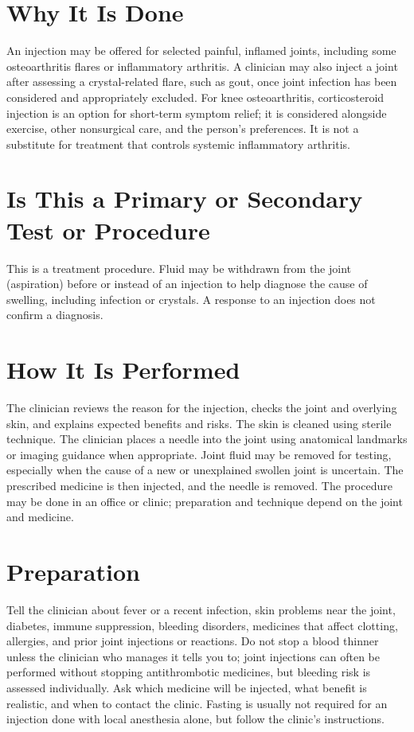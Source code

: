 \section*{Why It Is Done}
An injection may be offered for selected painful, inflamed joints, including some osteoarthritis flares or inflammatory arthritis. A clinician may also inject a joint after assessing a crystal-related flare, such as gout, once joint infection has been considered and appropriately excluded. For knee osteoarthritis, corticosteroid injection is an option for short-term symptom relief; it is considered alongside exercise, other nonsurgical care, and the person's preferences. It is not a substitute for treatment that controls systemic inflammatory arthritis.

\section*{Is This a Primary or Secondary Test or Procedure}
This is a treatment procedure. Fluid may be withdrawn from the joint (aspiration) before or instead of an injection to help diagnose the cause of swelling, including infection or crystals. A response to an injection does not confirm a diagnosis.

\section*{How It Is Performed}
The clinician reviews the reason for the injection, checks the joint and overlying skin, and explains expected benefits and risks. The skin is cleaned using sterile technique. The clinician places a needle into the joint using anatomical landmarks or imaging guidance when appropriate. Joint fluid may be removed for testing, especially when the cause of a new or unexplained swollen joint is uncertain. The prescribed medicine is then injected, and the needle is removed. The procedure may be done in an office or clinic; preparation and technique depend on the joint and medicine.

\section*{Preparation}
Tell the clinician about fever or a recent infection, skin problems near the joint, diabetes, immune suppression, bleeding disorders, medicines that affect clotting, allergies, and prior joint injections or reactions. Do not stop a blood thinner unless the clinician who manages it tells you to; joint injections can often be performed without stopping antithrombotic medicines, but bleeding risk is assessed individually. Ask which medicine will be injected, what benefit is realistic, and when to contact the clinic. Fasting is usually not required for an injection done with local anesthesia alone, but follow the clinic's instructions.


